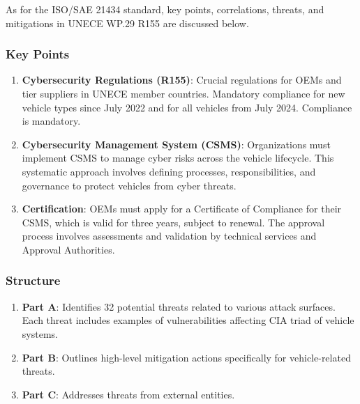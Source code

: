As for the ISO/SAE 21434 standard, key points, correlations, threats, and mitigations in UNECE WP.29 R155 are discussed below.

\subsubsection{Key Points}\label{subsubsec:key-points}
\begin{enumerate}
    \item \textbf{Cybersecurity Regulations (R155)}: Crucial regulations for OEMs and tier suppliers in UNECE member countries.
    Mandatory compliance for new vehicle types since July 2022 and for all vehicles from July 2024.
    Compliance is mandatory.
    \item \textbf{Cybersecurity Management System (CSMS)}: Organizations must implement CSMS to manage cyber risks across the vehicle lifecycle.
    This systematic approach involves defining processes, responsibilities, and governance to protect vehicles from cyber threats.
    \item \textbf{Certification}: OEMs must apply for a Certificate of Compliance for their CSMS, which is valid for three years, subject to renewal.
    The approval process involves assessments and validation by technical services and Approval Authorities.
\end{enumerate}


\subsubsection{Structure}\label{subsubsec:structure}
\begin{enumerate}
    \item \textbf{Part A}: Identifies 32 potential threats related to various attack surfaces.
    Each threat includes examples of vulnerabilities affecting CIA triad of vehicle systems.
    \item \textbf{Part B}: Outlines high-level mitigation actions specifically for vehicle-related threats.
    \item \textbf{Part C}: Addresses threats from external entities.
\end{enumerate}

